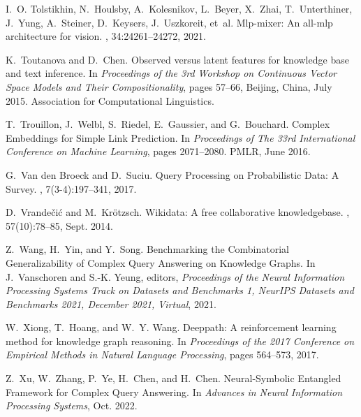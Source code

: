 \documentclass[11pt]{article}
\begin{document}
\begin{thebibliography}{10}
\begin{small}
I.~O. Tolstikhin, N.~Houlsby, A.~Kolesnikov, L.~Beyer, X.~Zhai, T.~Unterthiner,
J.~Yung, A.~Steiner, D.~Keysers, J.~Uszkoreit, et~al.
\newblock Mlp-mixer: An all-mlp architecture for vision.
,
34:24261--24272, 2021.

K.~Toutanova and D.~Chen.
\newblock Observed versus latent features for knowledge base and text
inference.
\newblock In {\em Proceedings of the 3rd {{Workshop}} on {{Continuous Vector
			Space Models}} and Their {{Compositionality}}}, pages 57--66, {Beijing,
	China}, July 2015. {Association for Computational Linguistics}.

T.~Trouillon, J.~Welbl, S.~Riedel, E.~Gaussier, and G.~Bouchard.
\newblock Complex {{Embeddings}} for {{Simple Link Prediction}}.
\newblock In {\em Proceedings of {{The}} 33rd {{International Conference}} on
	{{Machine Learning}}}, pages 2071--2080. {PMLR}, June 2016.

G.~{Van den Broeck} and D.~Suciu.
\newblock Query {{Processing}} on {{Probabilistic Data}}: {{A Survey}}.
,
7(3-4):197--341, 2017.

D.~Vrande{\v c}i{\'c} and M.~Kr{\"o}tzsch.
\newblock Wikidata: A free collaborative knowledgebase.
, 57(10):78--85, Sept. 2014.

Z.~Wang, H.~Yin, and Y.~Song.
\newblock Benchmarking the {{Combinatorial Generalizability}} of {{Complex
		Query Answering}} on {{Knowledge Graphs}}.
\newblock In J.~Vanschoren and S.-K. Yeung, editors, {\em Proceedings of the
	{{Neural Information Processing Systems Track}} on {{Datasets}} and
	{{Benchmarks}} 1, {{NeurIPS Datasets}} and {{Benchmarks}} 2021, {{December}}
	2021, Virtual}, 2021.

W.~Xiong, T.~Hoang, and W.~Y. Wang.
\newblock Deeppath: A reinforcement learning method for knowledge graph
reasoning.
\newblock In {\em Proceedings of the 2017 Conference on Empirical Methods in
	Natural Language Processing}, pages 564--573, 2017.

Z.~Xu, W.~Zhang, P.~Ye, H.~Chen, and H.~Chen.
\newblock Neural-{{Symbolic Entangled Framework}} for {{Complex Query
		Answering}}.
\newblock In {\em Advances in {{Neural Information Processing Systems}}}, Oct.
2022.


\end{small}
\end{thebibliography}
\end{document}
